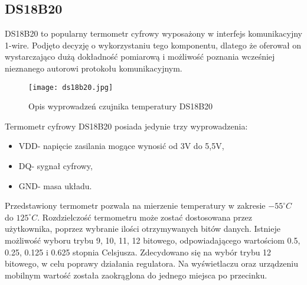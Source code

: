 \subsection{DS18B20}
DS18B20 to popularny termometr cyfrowy wyposażony w interfejs komunikacyjny 1-wire. Podjęto decyzję o wykorzystaniu tego komponentu, dlatego że oferował on wystarczająco dużą dokładność pomiarową i możliwość poznania wcześniej nieznanego autorowi protokołu komunikacyjnym.
\begin{figure}[H]
	\centering
	\texttt{[image: ds18b20.jpg]}
	\caption{Opis wyprowadzeń czujnika temperatury DS18B20}
\end{figure}
Termometr cyfrowy DS18B20 posiada jedynie trzy wyprowadzenia:
\begin{itemize}
\item VDD- napięcie zasilania mogące wynosić od 3V do 5,5V,
\item DQ- sygnał cyfrowy,
\item GND- masa układu.
\end{itemize}
Przedstawiony termometr pozwala na mierzenie temperatury w zakresie $-55^{\circ} C$ do $125^{\circ} C$. Rozdzielczość termometru może zostać dostosowana przez użytkownika, poprzez wybranie ilości otrzymywanych bitów danych. Istnieje możliwość wyboru trybu 9, 10, 11, 12 bitowego, odpowiadającego wartościom 0.5, 0.25, 0.125 i 0.625 stopnia Celsjusza. Zdecydowano się na wybór trybu 12 bitowego, w celu poprawy działania regulatora. Na wyświetlaczu oraz urządzeniu mobilnym wartość została zaokrąglona do jednego miejsca po przecinku.
%
